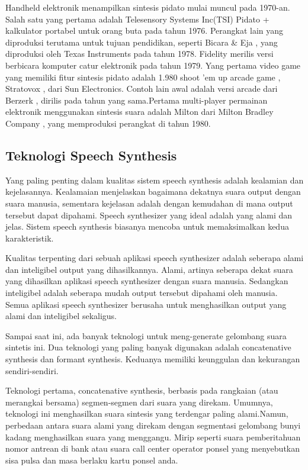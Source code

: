 Handheld elektronik menampilkan sintesis pidato mulai muncul pada 1970-an. Salah satu yang pertama adalah Telesensory Systems Inc(TSI) Pidato + kalkulator portabel untuk orang buta pada tahun 1976. Perangkat lain yang diproduksi terutama untuk tujuan pendidikan, seperti Bicara \& Eja , yang diproduksi oleh Texas Instruments pada tahun 1978. Fidelity merilis versi berbicara komputer catur elektronik pada tahun 1979. Yang pertama video game yang memiliki fitur sintesis pidato adalah 1.980 shoot ’em up arcade game , Stratovox , dari Sun Electronics. Contoh lain awal adalah versi arcade dari Berzerk , dirilis pada tahun yang sama.Pertama multi-player permainan elektronik menggunakan sintesis suara adalah Milton dari Milton Bradley Company , yang memproduksi perangkat di tahun 1980.

\subsection{Teknologi Speech Synthesis}
Yang paling penting dalam kualitas sistem speech synthesis adalah kealamian dan kejelasannya. Kealamaian menjelaskan bagaimana dekatnya suara output dengan suara manusia, sementara kejelasan adalah dengan kemudahan di mana output tersebut dapat dipahami. Speech synthesizer yang ideal adalah yang alami dan jelas. Sistem speech synthesis biasanya mencoba untuk memaksimalkan kedua karakteristik.

Kualitas terpenting dari sebuah aplikasi speech synthesizer adalah seberapa alami dan inteligibel output yang dihasilkannya. Alami, artinya seberapa dekat suara yang dihasilkan aplikasi speech synthesizer dengan suara manusia. Sedangkan inteligibel adalah seberapa mudah output tersebut dipahami oleh manusia. Semua aplikasi speech synthesizer berusaha untuk menghasilkan output yang alami dan inteligibel sekaligus.

Sampai saat ini, ada banyak teknologi untuk meng-generate gelombang suara sintetis ini. Dua teknologi yang paling banyak digunakan adalah concatenative synthesis dan formant synthesis. Keduanya memiliki keunggulan dan kekurangan sendiri-sendiri.

Teknologi pertama, concatenative synthesis, berbasis pada rangkaian (atau merangkai bersama) segmen-segmen dari suara yang direkam. Umumnya, teknologi ini menghasilkan suara sintesis yang terdengar paling alami.Namun, perbedaan antara suara alami yang direkam dengan segmentasi gelombang bunyi kadang menghasilkan suara yang menggangu. Mirip seperti suara pemberitahuan nomor antrean di bank atau suara call center operator ponsel yang menyebutkan sisa pulsa dan masa berlaku kartu ponsel anda.

